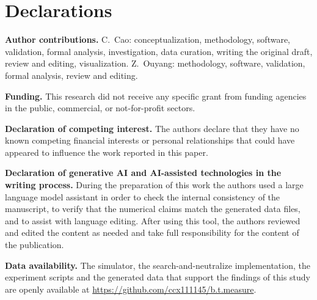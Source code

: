 \documentclass[journal,10pt]{IEEEtran}
\theoremstyle{definition}
\begin{document}
\section*{Declarations}

\noindent\textbf{Author contributions.}
C.~Cao: conceptualization, methodology, software, validation, formal analysis, investigation, data curation, writing the original draft, review and editing, visualization. Z.~Ouyang: methodology, software, validation, formal analysis, review and editing.

\noindent\textbf{Funding.}
This research did not receive any specific grant from funding agencies in the public, commercial, or not-for-profit sectors.

\noindent\textbf{Declaration of competing interest.}
The authors declare that they have no known competing financial interests or personal relationships that could have appeared to influence the work reported in this paper.

\noindent\textbf{Declaration of generative AI and AI-assisted technologies in the writing process.}
During the preparation of this work the authors used a large language model assistant in order to check the internal consistency of the manuscript, to verify that the numerical claims match the generated data files, and to assist with language editing. After using this tool, the authors reviewed and edited the content as needed and take full responsibility for the content of the publication.

\noindent\textbf{Data availability.}
The simulator, the search-and-neutralize implementation, the experiment scripts and the generated data that support the findings of this study are openly available at \url{https://github.com/ccx111145/b.t.measure}.
\end{document}
